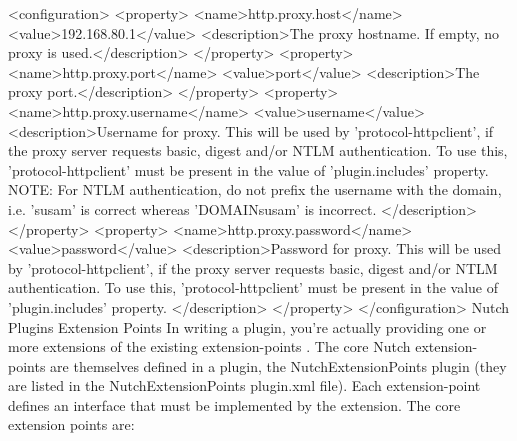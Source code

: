 {<configuration>
    <property>
        <name>http.proxy.host</name>
        <value>192.168.80.1</value>
        <description>The proxy hostname. If empty, no proxy is used.</description>
    </property>
    <property>
        <name>http.proxy.port</name>
        <value>port</value>
        <description>The proxy port.</description>
    </property>
    <property>
        <name>http.proxy.username</name>
        <value>username</value>
        <description>Username for proxy. This will be used by 'protocol-httpclient', if the proxy server requests basic,
            digest
            and/or NTLM authentication. To use this, 'protocol-httpclient' must be present in the value of
            'plugin.includes'
            property. NOTE: For NTLM authentication, do not prefix the username with the domain, i.e. 'susam' is correct
            whereas
            'DOMAINsusam' is incorrect.
        </description>
    </property>
    <property>
        <name>http.proxy.password</name>
        <value>password</value>
        <description>Password for proxy. This will be used by 'protocol-httpclient', if the proxy server requests basic,
            digest
            and/or NTLM authentication. To use this, 'protocol-httpclient' must be present in the value of
            'plugin.includes'
            property.
        </description>
    </property>
</configuration>
Nutch Plugins
Extension Points
In writing a plugin, you're actually providing one or more extensions of the existing extension-points . The core Nutch extension-points are themselves defined in a plugin, the NutchExtensionPoints plugin (they are listed in the NutchExtensionPoints plugin.xml file). Each extension-point defines an interface that must be implemented by the extension. The core extension points are:

}
